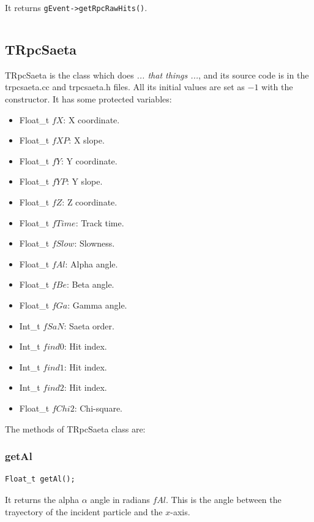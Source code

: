 \documentclass[a4paper]{book}
\begin{document}
It returns \texttt{gEvent->getRpcRawHits()}.

\[\]

\subsection{TRpcSaeta}

TRpcSaeta is the class which does \textit{... that things ...}, and its source code is in the trpcsaeta.cc and trpcsaeta.h files. All its initial values are set as $-1$ with the constructor. It has some protected variables:

\begin{itemize}
	\item Float\_t $fX$: X coordinate.
	\item Float\_t $fXP$: X slope.
	\item Float\_t $fY$: Y coordinate.
	\item Float\_t $fYP$: Y slope.
	\item Float\_t $fZ$: Z coordinate.
	\item Float\_t $fTime$: Track time.
	\item Float\_t $fSlow$: Slowness.
	\item Float\_t $fAl$: Alpha angle.
	\item Float\_t $fBe$: Beta angle.
	\item Float\_t $fGa$: Gamma angle.
	\item Int\_t   $fSaN$: Saeta order.
	\item Int\_t   $find0$: Hit index.
	\item Int\_t   $find1$: Hit index.
	\item Int\_t   $find2$: Hit index.
	\item Float\_t $fChi2$: Chi-square.
\end{itemize}

The methods of TRpcSaeta class are:

\subsubsection{getAl}

\begin{lstlisting}
Float_t getAl();
\end{lstlisting}

It returns the alpha $\alpha$ angle in radians $fAl$. This is the angle between the trayectory of the incident particle and the $x$-axis.

\[\]
\end{document}
